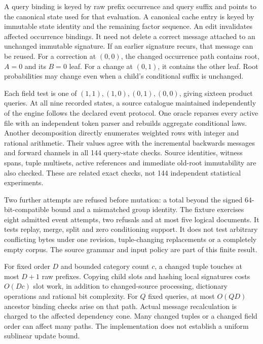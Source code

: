 A query binding is keyed by raw prefix occurrence and query suffix and points to the canonical state used for that evaluation.
A canonical cache entry is keyed by immutable state identity and the remaining factor sequence.
An edit invalidates affected occurrence bindings.
It need not delete a correct message attached to an unchanged immutable signature.
If an earlier signature recurs, that message can be reused.
For a correction at \((0,0)\), the changed occurrence path contains root, \(A=0\) and its \(B=0\) leaf.
For a change at \((0,1)\), it contains the other leaf.
Root probabilities may change even when a child's conditional suffix is unchanged.

Each field test is one of \((1,1),(1,0),(0,1),(0,0)\), giving sixteen product queries.
At all nine recorded states, a source catalogue maintained independently of the engine follows the declared event protocol.
One oracle reparses every active file with an independent token parser and rebuilds aggregate conditional laws.
Another decomposition directly enumerates weighted rows with integer and rational arithmetic.
Their values agree with the incremental backwards messages and forward channels in all 144 query-state checks.
Source identities, witness spans, tuple multisets, active references and immediate old-root immutability are also checked.
These are related exact checks, not 144 independent statistical experiments.

Two further attempts are refused before mutation: a total beyond the signed 64-bit-compatible bound and a mismatched group identity.
The fixture exercises eight admitted event attempts, two refusals and at most five logical documents.
It tests replay, merge, split and zero conditioning support.
It does not test arbitrary conflicting bytes under one revision, tuple-changing replacements or a completely empty corpus.
The source grammar and input policy are part of this finite result.

For fixed order \(D\) and bounded category count \(c\), a changed tuple touches at most \(D+1\) raw prefixes.
Copying child slots and hashing local signatures costs \(O(Dc)\) slot work, in addition to changed-source processing, dictionary operations and rational bit complexity.
For \(Q\) fixed queries, at most \(O(QD)\) ancestor binding checks arise on that path.
Actual message recalculation is charged to the affected dependency cone.
Many changed tuples or a changed field order can affect many paths.
The implementation does not establish a uniform sublinear update bound.

